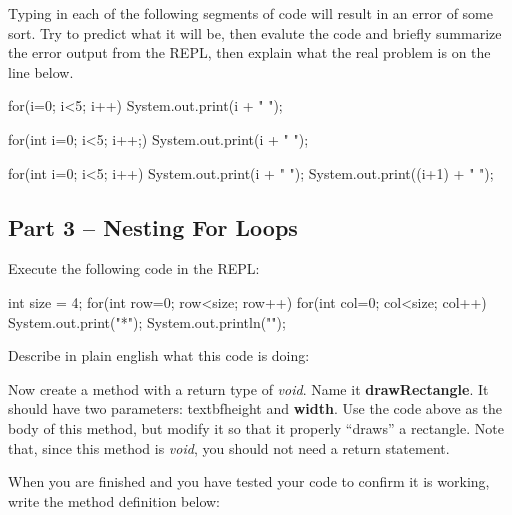\begin{eval}
Typing in each of the following segments of code will result in an error of some sort. Try to predict what it will be, then evalute the code and briefly summarize the error output from the REPL, then  explain what the real problem is on the line below.

\begin{sevalenum}
\item 
\begin{code}
for(i=0; i<5; i++) 
  System.out.print(i + " ");
\end{code}
\evallinethree



\item 
\begin{code}
for(int i=0; i<5; i++;) 
  System.out.print(i + " ");
\end{code}
\evallinethree



\item 
\begin{code}
for(int i=0; i<5; i++) 
  System.out.print(i + " ");
  System.out.print((i+1) + " ");
\end{code}
\evallinethree

\end{sevalenum}
\end{eval}


\initialbox

\subsection{Part 3 -- Nesting For Loops}

\begin{exer}
Execute the following code in the REPL:

\begin{code}
int size = 4;
for(int row=0; row<size; row++) {
  for(int col=0; col<size; col++) {
    System.out.print("*");
  }
  System.out.println("");
}
\end{code}

Describe in plain english what this code is doing:
\evallinethree
\end{exer}


\begin{exer}
Now create a method with a return type of \textit{void}. Name it \textbf{drawRectangle}. It should have two parameters: textbf{height} and \textbf{width}. Use the code above as the body of this method, but modify it so that it properly ``draws'' a rectangle. Note that, since this method is \textit{void}, you should not need a return statement. 

When you are finished and you have tested your code to confirm it is working, write the method definition below:

\evallineeight
\end{exer}


